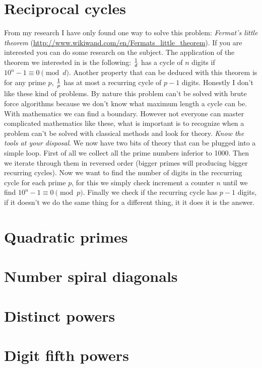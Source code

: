\documentclass[11pt]{article}
\begin{document}
\section{Reciprocal cycles} 
From my research I have only found one way to solve this problem: \emph{Fermat's little theorem} (\url{http://www.wikiwand.com/en/Fermats_little_theorem}). If you are interested you can do some research on the subject. The application of the theorem we interested in is the following: $1 \over d$ has a cycle of $n$ digits if $10^n-1 \equiv 0 \pmod d$. Another property that can be deduced with this theorem is for any prime $p$, $1 \over p$ has at most a recurring cycle of $p-1$ digits. Honestly I don't like these kind of problems. By nature this problem can't be solved with brute force algorithms because we don't know what maximum length a cycle can be. With mathematics we can find a boundary. However not everyone can master complicated mathematics like these, what is important is to recognize when a problem can't be solved with classical methods and look for theory. \emph{Know the tools at your disposal}. We now have two bits of theory that can be plugged into a simple loop. First of all we collect all the prime numbers inferior to 1000. Then we iterate through them in reversed order (bigger primes will producing bigger recurring cycles). Now we want to find the number of digits in the reccurring cycle for each prime $p$, for this we simply check increment a counter $n$ until we find $10^n-1 \equiv 0 \pmod p$. Finally we check if the recurring cycle has $p-1$ digits, if it doesn't we do the same thing for a different thing, it it does it is the answer.

\section{Quadratic primes} 

\section{Number spiral diagonals} 

\section{Distinct powers} 

\section{Digit fifth powers}
\end{document}

